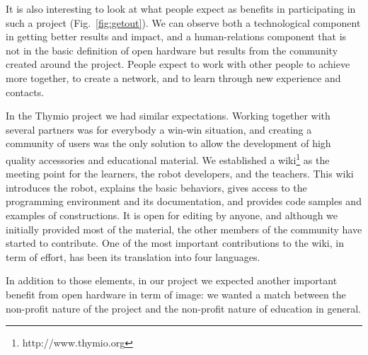 \documentclass[letterpaper, 10 pt, conference]{ieeeconf}  %
\begin{document}
It is also interesting to look at what people expect as benefits in participating in such a project (Fig.~\ref{fig:getout}).
We can observe both a technological component in getting better results and impact, and a human-relations component that is not in the basic definition of open hardware but results from the community created around the project. 
People expect to work with other people to achieve more together, to create a network, and to learn through new experience and contacts. 

In the Thymio project we had similar expectations. 
Working together with several partners was for everybody a win-win situation, and creating a community of users was the only solution to allow the development of high quality accessories and educational material.
We established a wiki\footnote{http://www.thymio.org} as the meeting point for the learners, the robot developers, and the teachers.
This wiki introduces the robot, explains the basic behaviors, gives access to the programming environment and its documentation, and provides code samples and examples of constructions.
It is open for editing by anyone, and although we initially provided most of the material, the other members of the community have started to contribute.
One of the most important contributions to the wiki, in term of effort, has been its translation into four languages.

In addition to those elements, in our project we expected another important benefit from open hardware in term of image: we wanted a match between the non-profit nature of the project and the non-profit nature of education in general. 
\end{document}
